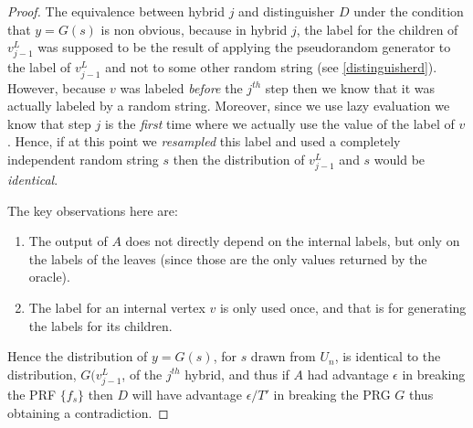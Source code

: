 \begin{proof}
The equivalence between hybrid \(j\) and distinguisher \(D\) under the
condition that \(y=G(s)\) is non obvious, because in hybrid \(j\), the
label for the children of \(v_{j-1}^{L}\) was supposed to be the result
of applying the pseudorandom generator to the label of \(v_{j-1}^{L}\)
and not to some other random string (see \cref{distinguisherd}).
However, because \(v\) was labeled \emph{before} the \(j^{th}\) step
then we know that it was actually labeled by a random string. Moreover,
since we use lazy evaluation we know that step \(j\) is the \emph{first}
time where we actually use the value of the label of \(v\). Hence, if at
this point we \emph{resampled} this label and used a completely
independent random string \(s\) then the distribution of \(v_{j-1}^{L}\)
and \(s\) would be \emph{identical}.

The key observations here are:

\begin{enumerate}
\def\labelenumi{\arabic{enumi}.}
\item
  The output of \(A\) does not directly depend on the internal labels,
  but only on the labels of the leaves (since those are the only values
  returned by the oracle).
\item
  The label for an internal vertex \(v\) is only used once, and that is
  for generating the labels for its children.
\end{enumerate}

Hence the distribution of \(y=G(s)\), for \(s\) drawn from \(U_n\), is
identical to the distribution, \(G(v_{j-1}^{L}\), of the \(j^{th}\)
hybrid, and thus if \(A\) had advantage \(\epsilon\) in breaking the PRF
\(\{ f_s \}\) then \(D\) will have advantage \(\epsilon/T'\) in breaking
the PRG \(G\) thus obtaining a contradiction.

\end{proof}

\hypertarget{prfpracticerem}{}

